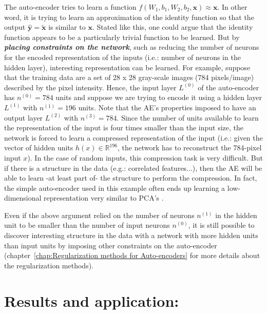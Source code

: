 \documentclass[a4paper,11pt]{report}
\newcommand{\Important}[1]{\textbf{{\em #1}}}
\begin{document}
		The auto-encoder tries to learn a function $f(W_{1},b_{1},W_{2},b_{2},\mathbf{x}) \approx \mathbf{x}$. In other word, it is trying to learn an approximation of the identity function so that the output $\mathbf{\hat{y}}= \mathbf{\tilde{x}}$ is similar to $\mathbf{x}$. Stated like this, one could argue that the identity function appears to be a particularly trivial function to be learned. But by \Important{placing constraints on the network}, such as  reducing the number of neurons for the encoded representation of the inputs (i.e.: number of neurons in the hidden layer), interesting representation can be learned. For example, suppose that the training data are a set of 28 x 28 gray-scale images (784 pixels/image) described by the pixel intensity. Hence, the input layer $L^{(0)}$ of the auto-encoder has $n^{(0)} = 784$ units and suppose we are trying to encode it using a hidden layer $L^{(1)}$ with $n^{(1)} = 196$ units. Note that the AE's properties imposed to have an output layer $L^{(2)}$ with  $n^{(3)} = 
784$. Since the number of units available to learn the 
representation of the input is four times smaller than the input size, the network is forced to learn a compressed representation of the input (i.e.: given the vector of hidden units $h(x) \in \mathbb{R}^{196}$, the network has to reconstruct the 784-pixel input $x$). In the case of random inputs, this compression task is very difficult. But if there is a structure in the data (e.g.: correlated features...), then the AE will be able to learn -at least part of- the structure to perform the compression. In fact, the simple auto-encoder used in this example often ends up learning a low-dimensional representation very similar to PCA's \cite{Ng_course}. \\\par
		
		Even if the above argument relied on the number of neurons $n^{(1)}$ in the hidden unit to be smaller than the number of input neurons $n^{(0)}$, it is still possible to discover interesting structure in the data with a network with more hidden units than input units by imposing other constraints on the auto-encoder (chapter~\ref{chap:Regularization methods for Auto-encoders} for more details about the regularization methods).
				
				
	\section{Results and application:}
		\label{seq:AE and SAE/Training procedure:}
		
\end{document}
